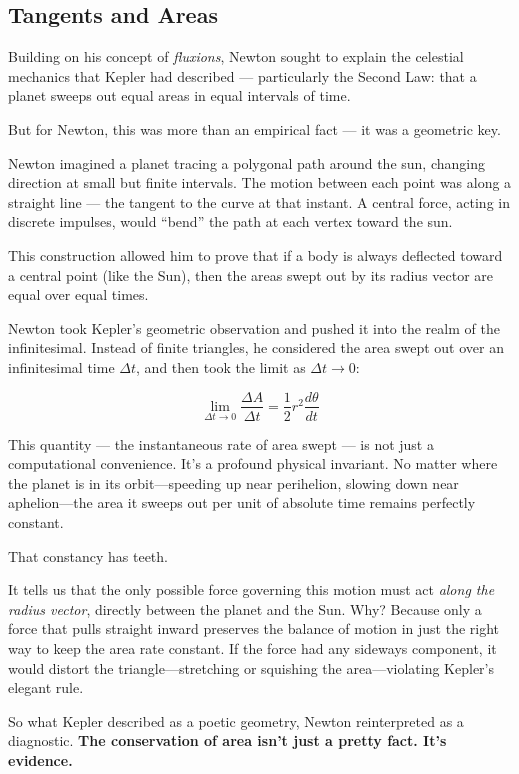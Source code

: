 \subsection{Tangents and Areas} 

Building on his concept of \textit{fluxions}, Newton sought to explain the celestial mechanics that Kepler had described — particularly the Second Law: that a planet sweeps out equal areas in equal intervals of time.

But for Newton, this was more than an empirical fact — it was a geometric key.

Newton imagined a planet tracing a polygonal path around the sun, changing direction at small but finite intervals. The motion between each point was along a straight line — the tangent to the curve at that instant. A central force, acting in discrete impulses, would “bend” the path at each vertex toward the sun.

This construction allowed him to prove that if a body is always deflected toward a central point (like the Sun), then the areas swept out by its radius vector are equal over equal times.

Newton took Kepler’s geometric observation and pushed it into the realm of the infinitesimal. Instead of finite triangles, he considered the area swept out over an infinitesimal time \( \Delta t \), and then took the limit as \( \Delta t \to 0 \):

\[
\lim_{\Delta t \to 0} \frac{\Delta A}{\Delta t} = \frac{1}{2} r^2 \frac{d\theta}{dt}
\]

This quantity — the instantaneous rate of area swept — is not just a computational convenience. It’s a profound physical invariant. No matter where the planet is in its orbit—speeding up near perihelion, slowing down near aphelion—the area it sweeps out per unit of absolute time remains perfectly constant.

That constancy has teeth.

It tells us that the only possible force governing this motion must act \textit{along the radius vector}, directly between the planet and the Sun. Why? Because only a force that pulls straight inward preserves the balance of motion in just the right way to keep the area rate constant. If the force had any sideways component, it would distort the triangle—stretching or squishing the area—violating Kepler’s elegant rule.

So what Kepler described as a poetic geometry, Newton reinterpreted as a diagnostic.
\textbf{The conservation of area isn’t just a pretty fact. It’s evidence.}

